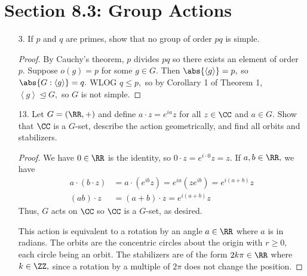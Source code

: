 \documentclass{article}
\begin{document}
\section*{Section 8.3: Group Actions}

\begin{itemize}
	\item[3.] If $p$ and $q$ are primes, show that no group of order $pq$ is simple.
		\begin{proof}
			By Cauchy's theorem, $p$ divides $pq$ so there exists an element of order $p.$ Suppose $o(g)=p$ for some $g\in G.$ Then $\abs{\left< g\right>}=p,$ so $\abs{G:\left< g\right>}=q.$ WLOG $q\le p,$ so by Corollary 1 of Theorem 1, $\left< g\right>\unlhd G,$ so $G$ is not simple.
			
		\end{proof}

	\item[13.] Let $G=\left( \RR, + \right)$ and define $a\cdot z=e^{ia}z$ for all $z\in\CC$ and $a\in G.$ Show that $\CC$ is a $G$-set, describe the action geometrically, and find all orbits and stabilizers.
		\begin{proof}
			We have $0\in \RR$ is the identity, so $0\cdot z = e^{i\cdot 0} z = z.$ If $a, b\in\RR,$ we have
			\begin{align*}
				a\cdot(b\cdot z) &= a\cdot (e^{ib}z) = e^{ia}(z e^{ib}) = e^{i(a+b)}z \\
				(ab)\cdot z &= (a+b)\cdot z = e^{i(a+b)}z
			\end{align*}
			Thus, $G$ acts on $\CC$ so $\CC$ is a $G$-set, as desired. 

			This action is equivalent to a rotation by an angle $a\in \RR$ where $a$ is in radians. The orbits are the concentric circles about the origin with $r\ge 0,$ each circle being an orbit. The stabilizers are of the form $2k\pi\in \RR$ where $k\in\ZZ,$ since a rotation by a multiple of $2\pi$ does not change the position.
			
		\end{proof}


\end{itemize}
\end{document}
